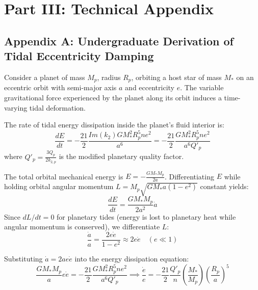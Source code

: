 \documentclass[11pt,a4paper]{article}
\begin{document}
\section*{Part III: Technical Appendix}

\subsection*{Appendix A: Undergraduate Derivation of Tidal Eccentricity Damping}

Consider a planet of mass $M_p$, radius $R_p$, orbiting a host star of mass $M_*$ on an eccentric orbit with semi-major axis $a$ and eccentricity $e$. The variable gravitational force experienced by the planet along its orbit induces a time-varying tidal deformation.

The rate of tidal energy dissipation inside the planet's fluid interior is:
\begin{equation}
\frac{dE}{dt} = -\frac{21}{2} \frac{Im(k_2) G M_*^2 R_p^5 n e^2}{a^6} = -\frac{21}{2} \frac{G M_*^2 R_p^5 n e^2}{a^6 Q'_p}
\end{equation}
where $Q'_p = \frac{3 Q_p}{2 k_{2, p}}$ is the modified planetary quality factor.

The total orbital mechanical energy is $E = -\frac{G M_* M_p}{2 a}$. Differentiating $E$ while holding orbital angular momentum $L = M_p \sqrt{G M_* a (1 - e^2)}$ constant yields:
\begin{equation}
\frac{dE}{dt} = \frac{G M_* M_p}{2 a^2} \dot{a}
\end{equation}
Since $dL/dt = 0$ for planetary tides (energy is lost to planetary heat while angular momentum is conserved), we differentiate $L$:
\begin{equation}
\frac{\dot{a}}{a} = \frac{2 e \dot{e}}{1 - e^2} \approx 2 e \dot{e} \quad (e \ll 1)
\end{equation}

Substituting $\dot{a} = 2 a e \dot{e}$ into the energy dissipation equation:
\begin{equation}
\frac{G M_* M_p}{a} e \dot{e} = -\frac{21}{2} \frac{G M_*^2 R_p^5 n e^2}{a^6 Q'_p} \implies \frac{\dot{e}}{e} = -\frac{21}{2} \frac{Q'_p}{n} \left(\frac{M_*}{M_p}\right) \left(\frac{R_p}{a}\right)^5
\end{equation}
\end{document}
